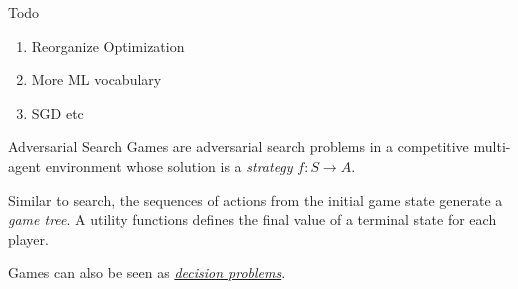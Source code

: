 \documentclass{cognito}
\begin{document}
\begin{answer}{Todo}
	\begin{enumerate}
		\item Reorganize Optimization
		\item More ML vocabulary
		\item SGD etc
	\end{enumerate}
\end{answer}


\begin{note}{Adversarial Search}
	Games are adversarial search problems in a competitive multi-agent environment
	whose solution is a \emph{strategy} $f : S \to A$.
	\vspace{5pt}
	
	Similar to search, the sequences of actions from the initial game state generate a \emph{game tree}.
	A utility functions defines the final value of a terminal state for each player.
	\begin{remark} Games can also be seen as \hyperref[note:Stochastic Decision Problems]{\it decision problems}.
	\end{remark}
	\vspace{-5pt}
\end{note}


\end{document}
